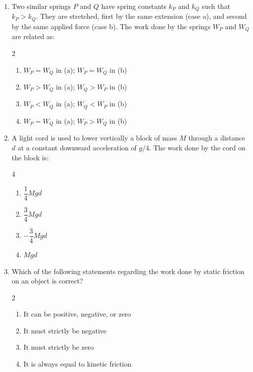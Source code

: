 \documentclass[11pt,a4paper]{article}
\begin{document}
\begin{enumerate}[label=\textbf{\arabic*.},leftmargin=18pt,itemsep=8pt]
  \item Two similar springs $P$ and $Q$ have spring constants $k_P$ and $k_Q$ such that $k_P > k_Q$. They are stretched, first by the same extension (case a), and second by the same applied force (case b). The work done by the springs $W_P$ and $W_Q$ are related as:
  \begin{multicols}{2}
    \begin{enumerate}[label=(\Alph*)]
      \item $W_P = W_Q$ in (a); $W_P = W_Q$ in (b)
      \item $W_P > W_Q$ in (a); $W_Q > W_P$ in (b)
      \item $W_P < W_Q$ in (a); $W_Q < W_P$ in (b)
      \item $W_P = W_Q$ in (a); $W_P > W_Q$ in (b)
    \end{enumerate}
  \end{multicols}

  \item A light cord is used to lower vertically a block of mass $M$ through a distance $d$ at a constant downward acceleration of $g/4$. The work done by the cord on the block is:
  \begin{multicols}{4}
    \begin{enumerate}[label=(\Alph*)]
      \item $\dfrac{1}{4}Mgd$
      \item $\dfrac{3}{4}Mgd$
      \item $-\dfrac{3}{4}Mgd$
      \item $Mgd$
    \end{enumerate}
  \end{multicols}

  \item Which of the following statements regarding the work done by static friction on an object is correct?
  \begin{multicols}{2}
    \begin{enumerate}[label=(\Alph*)]
      \item It can be positive, negative, or zero
      \item It must strictly be negative
      \item It must strictly be zero
      \item It is always equal to kinetic friction
    \end{enumerate}
  \end{multicols}


\end{enumerate}
\end{document}
